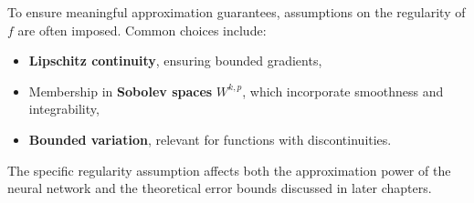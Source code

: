 To ensure meaningful approximation guarantees, assumptions on the regularity of \( f \) are often imposed. Common choices include:
\begin{itemize}
  \item \textbf{Lipschitz continuity}, ensuring bounded gradients,
  \item Membership in \textbf{Sobolev spaces} \( W^{k,p} \), which incorporate smoothness and integrability,
  \item \textbf{Bounded variation}, relevant for functions with discontinuities.
\end{itemize}

The specific regularity assumption affects both the approximation power of the neural network and the theoretical error bounds discussed in later chapters.
